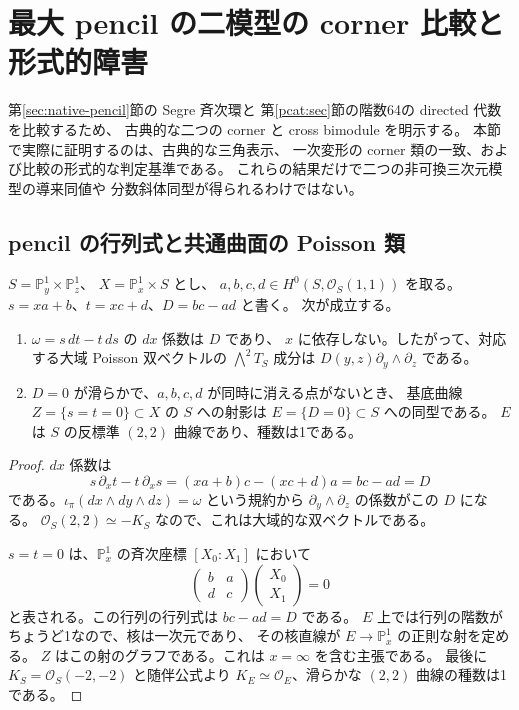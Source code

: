 \section{最大 pencil の二模型の corner 比較と形式的障害}
\label{sec:pencil-corner-comparison}

第\ref{sec:native-pencil}節の Segre 斉次環と
第\ref{pcat:sec}節の階数64の directed 代数を比較するため、
古典的な二つの corner と cross bimodule を明示する。
本節で実際に証明するのは、古典的な三角表示、
一次変形の corner 類の一致、および比較の形式的な判定基準である。
これらの結果だけで二つの非可換三次元模型の導来同値や
分数斜体同型が得られるわけではない。

\subsection{pencil の行列式と共通曲面の Poisson 類}

\begin{lemma}
\label{pcc:lem:determinant}
$S=\mathbb P^1_y\times\mathbb P^1_z$、
$X=\mathbb P^1_x\times S$ とし、
$a,b,c,d\in H^0(S,\mathcal O_S(1,1))$ を取る。
$s=xa+b$、$t=xc+d$、$D=bc-ad$ と書く。
次が成立する。
\begin{enumerate}
\item $\omega=s\,dt-t\,ds$ の $dx$ 係数は $D$ であり、
$x$ に依存しない。したがって、対応する大域 Poisson 双ベクトルの
$\bigwedge^2T_S$ 成分は
$D(y,z)\partial_y\wedge\partial_z$ である。
\item $D=0$ が滑らかで、$a,b,c,d$ が同時に消える点がないとき、
基底曲線 $Z=\{s=t=0\}\subset X$ の $S$ への射影は
$E=\{D=0\}\subset S$ への同型である。
$E$ は $S$ の反標準 $(2,2)$ 曲線であり、種数は1である。
\end{enumerate}
\end{lemma}
\begin{proof}
$dx$ 係数は
\[
 s\,\partial_xt-t\,\partial_xs
 =(xa+b)c-(xc+d)a=bc-ad=D
\]
である。$\iota_{\pi}(dx\wedge dy\wedge dz)=\omega$ という規約から
$\partial_y\wedge\partial_z$ の係数がこの $D$ になる。
$\mathcal O_S(2,2)\simeq-K_S$ なので、これは大域的な双ベクトルである。

$s=t=0$ は、$\mathbb P^1_x$ の斉次座標 $[X_0:X_1]$ において
\[
 \begin{pmatrix}b&a\\d&c\end{pmatrix}
 \begin{pmatrix}X_0\\X_1\end{pmatrix}=0
\]
と表される。この行列の行列式は $bc-ad=D$ である。
$E$ 上では行列の階数がちょうど1なので、核は一次元であり、
その核直線が $E\to\mathbb P^1_x$ の正則な射を定める。
$Z$ はこの射のグラフである。これは $x=\infty$ を含む主張である。
最後に $K_S=\mathcal O_S(-2,-2)$ と随伴公式より
$K_E\simeq\mathcal O_E$、滑らかな $(2,2)$ 曲線の種数は1である。
\end{proof}

